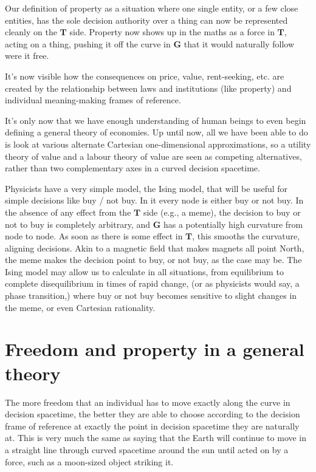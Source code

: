 Our definition of property as a situation where one single entity, or a few close entities, has the sole decision authority over a thing can now be represented cleanly on the $\mathbf{T}$ side. Property now shows up in the maths as a force in $\mathbf{T}$, acting on a thing, pushing it off the curve in $\mathbf{G}$ that it would naturally follow were it free.


It’s now visible how the consequences on price, value, rent\hyp{}seeking, etc. are created by the relationship between laws and institutions (like property) and individual meaning\hyp{}making frames of reference. 


It's only now that we have enough understanding of human beings to even begin defining a general theory of economies. Up until now, all we have been able to do is look at various alternate Cartesian one\hyp{}dimensional approximations, so a utility theory of value and a labour theory of value are seen as competing alternatives, rather than two complementary axes in a curved decision spacetime.


Physicists have a very simple model, the Ising model, that will be useful for simple decisions like buy / not buy. In it every node is either buy or not buy. In the absence of any effect from the $\mathbf{T}$ side (e.g., a meme), the decision to buy or not to buy is completely arbitrary, and  $\mathbf{G}$ has a potentially high curvature from node to node. As soon as there is some effect in  $\mathbf{T}$, this smooths the curvature, aligning decisions. Akin to a magnetic field that makes magnets all point North, the meme makes the decision point to buy, or not buy, as the case may be. The Ising model may allow us to calculate in all situations, from equilibrium to complete disequilibrium in times of rapid change, (or as physicists would say, a phase transition,) where buy or not buy becomes sensitive to slight changes in the meme, or even Cartesian rationality.




\section*{Freedom and property in a general theory}
The more freedom  that an individual has to move exactly along the curve in decision spacetime, the better they are able to choose according to the decision frame of reference at exactly the point in decision spacetime they are naturally at. This is very much the same as saying that the Earth will continue to move in a straight line through curved spacetime around the sun until acted on by a force, such as a moon\hyp{}sized object striking it. 


